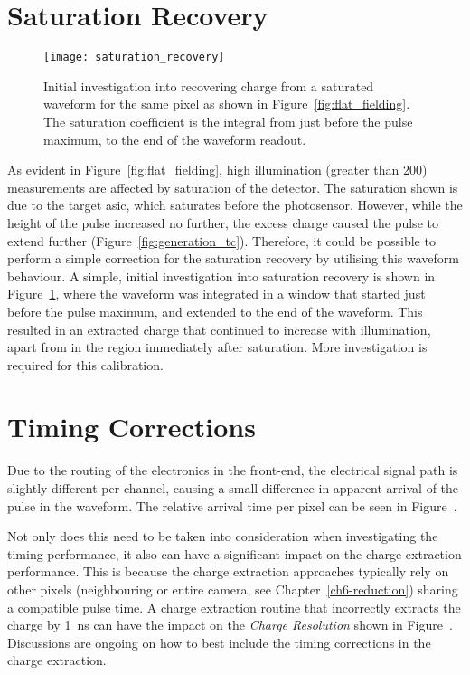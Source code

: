 \section{Saturation Recovery}

\begin{figure}
	\centering
    \texttt{[image: saturation\_recovery]} 
	\caption[Saturation Recovery.]{Initial investigation into recovering charge from a saturated waveform for the same pixel as shown in Figure~\ref{fig:flat_fielding}. The saturation coefficient is the integral from just before the pulse maximum, to the end of the waveform readout.}
	\label{fig:saturation_recovery}
\end{figure}

As evident in Figure~\ref{fig:flat_fielding}, high illumination (greater than \utilde\SI{200}{\pe}) measurements are affected by saturation of the detector. The saturation shown is due to the \gls{target} \gls{asic}, which saturates before the photosensor. However, while the height of the pulse increased no further, the excess charge caused the pulse to extend further (Figure~\ref{fig:generation_tc}). Therefore, it could be possible to perform a simple correction for the saturation recovery by utilising this waveform behaviour. A simple, initial investigation into saturation recovery is shown in Figure~\ref{fig:saturation_recovery}, where the waveform was integrated in a window that started just before the pulse maximum, and extended to the end of the waveform. This resulted in an extracted charge that continued to increase with illumination, apart from in the region immediately after saturation. More investigation is required for this calibration.

\section{Timing Corrections} \label{section:timing_corrections}

Due to the routing of the electronics in the front-end, the electrical signal path is slightly different per channel, causing a small difference in apparent arrival of the pulse in the waveform. The relative arrival time per pixel can be seen in Figure~. 

Not only does this need to be taken into consideration when investigating the timing performance, it also can have a significant impact on the charge extraction performance. This is because the charge extraction approaches typically rely on other pixels (neighbouring or entire camera, see Chapter~\ref{ch6-reduction}) sharing a compatible pulse time. A charge extraction routine that incorrectly extracts the charge by \SI{1}{ns} can have the impact on the \textit{Charge Resolution} shown in Figure~. Discussions are ongoing on how to best include the timing corrections in the charge extraction.

